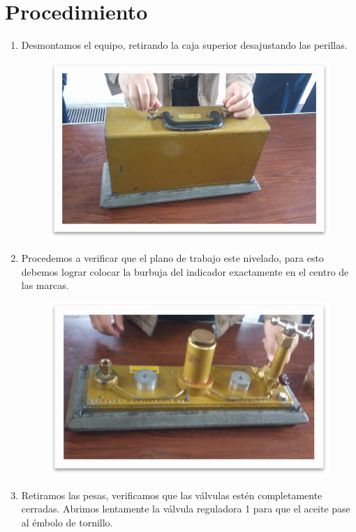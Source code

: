 \documentclass[a4paper,12pt]{report}
\begin{document}
\chapter{Procedimiento}
\begin{enumerate}
\item Desmontamos el equipo, retirando la caja superior desajustando las perillas.
\begin{figure}[H]
\centering
\includegraphics[scale=0.45]{proc1.png}
\end{figure}
\item Procedemos a verificar que el plano de trabajo este nivelado, para esto debemos lograr colocar la burbuja del indicador exactamente en el centro de las marcas.
\begin{figure}[H]
\centering
\includegraphics[scale=0.45]{proc2.png}
\end{figure}
\item Retiramos las pesas, verificamos que las válvulas estén completamente cerradas. Abrimos lentamente la válvula reguladora 1 para que el aceite pase al émbolo de tornillo.

\end{enumerate}
\end{document}
